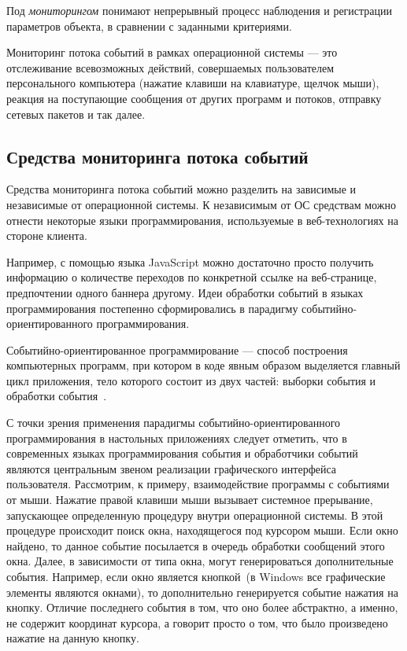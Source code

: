 Под \textit{мониторингом} понимают непрерывный процесс наблюдения и регистрации
параметров объекта, в сравнении с заданными критериями.

Мониторинг потока событий в рамках операционной системы --- это
отслеживание всевозможных действий, совершаемых пользователем персонального
компьютера (нажатие клавиши на клавиатуре, щелчок мыши), реакция на
поступающие сообщения от других программ и потоков, отправку
сетевых пакетов и так далее.

\subsection{Средства мониторинга потока событий}
\label{sub:monitoring_tools}

Средства мониторинга потока событий можно разделить на зависимые и независимые
от операционной системы. К независимым от ОС средствам можно отнести некоторые
языки программирования, используемые в веб-технологиях на стороне клиента.

Например, с помощью языка JavaScript можно достаточно просто получить информацию
о количестве переходов по конкретной ссылке на веб-странице, предпочтении одного
баннера другому. Идеи обработки событий в языках программирования постепенно
сформировались в парадигму событийно-ориентированного программирования.

Событийно-ориентированное программирование --- способ построения компьютерных
программ, при котором в коде явным образом выделяется главный цикл приложения,
тело которого состоит из двух частей: выборки события
и обработки события~\cite{wiki_event_driven_p}.

С точки зрения применения парадигмы событийно-ориентированного программирования
в настольных приложениях следует отметить, что в современных языках программирования
события и обработчики событий являются центральным звеном реализации
графического интерфейса пользователя. Рассмотрим, к примеру,
взаимодействие программы с событиями от мыши. Нажатие правой клавиши мыши
вызывает системное прерывание, запускающее определенную процедуру внутри
операционной системы. В этой процедуре происходит поиск окна,
находящегося под курсором мыши. Если окно найдено, то данное событие посылается
в очередь обработки сообщений этого окна. Далее, в зависимости от типа окна,
могут генерироваться дополнительные события. Например, если окно является
кнопкой~(в Windows все графические элементы являются окнами), то дополнительно
генерируется событие нажатия на кнопку. Отличие последнего события в том,
что оно более абстрактно, а именно, не содержит координат курсора, а говорит
просто о том, что было произведено нажатие на данную кнопку.

